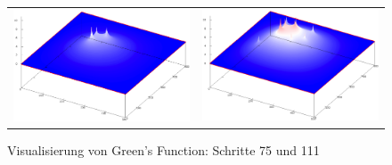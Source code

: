 \begin{refsection}
\begin{figure}
\begin{tabular}{cc}
\includegraphics[width=0.48\hsize]{green/images/resultate/np/step0057.png}
& \includegraphics[width=0.48\hsize]{green/images/resultate/np/step0111.png}
\end{tabular}		
\caption{Visualisierung von Green's Function: Schritte 75 und 111 }
\end{figure}
	

\end{refsection}
